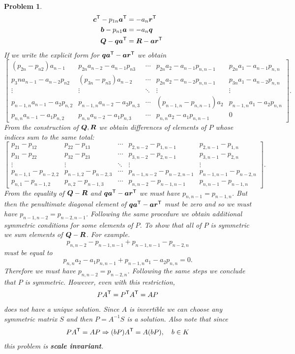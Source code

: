 \documentclass{article}
\theoremstyle{pprop}
\newtheorem{problem}{Problem}[section]
\begin{document}
\begin{problem}
\begin{align*}
 \vb*{c}^{\sf T}-p_{1n}\vb*{a}^{\sf T} & = -a_n \vb*{r}^{\sf T} \\
 \vb*{b} - p_{n1}\vb*{a} &= -a_n \vb*{q} \\
 \vb*{Q}- \vb*{q} \vb*{a}^{\sf T}&=\vb*{R}- \vb*{a} \vb*{r}^{\sf T}
\end{align*}
If we write the explicit form for $\vb*{q} \vb*{a}^{\sf T}-\vb*{a} \vb*{r}^{\sf T}$ we obtain
$$
\begin{bmatrix}
(p_{2n}-p_{n2})a_{n-1} & p_{2n}a_{n-2}-a_{n-1}p_{n3} & \cdots & p_{2n}a_2 -a_{n-1}p_{n,n-1} & p_{2n}a_1 - a_{n-1}p_{n,n}\\
p_3na_{n-1}-a_{n-2}p_{n2} & (p_{3n}-p_{n3})a_{n-2} & \cdots & p_{2n}a_2 - a_{n-2}p_{n,n-1} & p_{3n}a_1 - a_{n-2}p_{n,n}\\
\vdots & \vdots & \ddots & \vdots & \vdots \\
p_{n-1,n}a_{n-1}-a_2p_{n,2} & p_{n-1,n}a_{n-2}-a_2p_{n,3} & \cdots &
(p_{n-1,n}-p_{n,n-1})a_2 & p_{n-1,n}a_1-a_2p_{n,n}\\
p_{n,n}a_{n-1}-a_1p_{n,2} & p_{n,n}a_{n-2}-a_1p_{n,3} & \cdots & p_{n,n}a_2-a_1p_{n,n-1} & 0
\end{bmatrix}.
$$
From the construction of $\vb*{Q},\vb*{R}$ we obtain differences of elements of $P$ whose indices sum to the same total:
$$
\begin{bmatrix}
p_{21}-p_{12} & p_{22}-p_{13} & \cdots & p_{2,n-2}-p_{1,n-1} & p_{2,n-1}-p_{1,n}\\
p_{31}-p_{22} & p_{32}-p_{23} & \cdots & p_{3,n-2}-p_{2,n-1} & p_{3,n-1}-p_{2,n}\\
\vdots & \vdots &\ddots & \vdots & \vdots \\
p_{n-1,1}-p_{n-2,2} & p_{n-1,2}-p_{n-2,3} & \cdots & p_{n-1,n-2}-p_{n-2,n-1} & p_{n-1,n-1}-p_{n-2,n}\\
p_{n,1}-p_{n-1,2} & p_{n,2}-p_{n-1,3} & \cdots & p_{n,n-2}-p_{n-1,n-1} & p_{n,n-1}-p_{n-1,n}
\end{bmatrix}.
$$
From the equality of $\vb*{Q}-\vb*{R}$ and $\vb*{q} \vb*{a}^{\sf T}-\vb*{a} \vb*{r}^{\sf T}$ we must have $p_{n,n-1}=p_{n-1,n}$. 
But then the penultimate diagonal element of $\vb*{q} \vb*{a}^{\sf T}-\vb*{a} \vb*{r}^{\sf T}$ must be zero and so we must have 
$p_{n-1,n-2}=p_{n-2,n-1}$. Following the same procedure we obtain additional symmetric conditions for some elements of $P$.
To show that all of $P$ is symmetric we sum elements of $\vb*{Q}-\vb*{R}$. For example.
$$
p_{n,n-2}-p_{n-1,n-1}+p_{n-1,n-1}-p_{n-2,n}
$$
must be equal to
$$
p_{n,n}a_2-a_1 p_{n,n-1}+p_{n-1,n}a_1 -a_2 p_{n,n}=0.
$$
Therefore we must have $p_{n,n-2}=p_{n-2,n}$. Following the same steps we conclude that $P$ is symmetric.  However, even with this 
restriction, $$PA^{\sf T}=P^{\sf T}A^{\sf T}=AP$$ does not have a unique solution.  Since $A$ is invertible we can choose any 
symmetric matrix $S$ and then $P=A^{-1}S$ is a solution.  Also note that since 
$$ PA^{\sf T}=AP \Rightarrow (bP)A^{\sf T}=A(bP), \quad b \in K$$
this problem is \textbf{scale invariant}.  


\end{problem}
\end{document}
